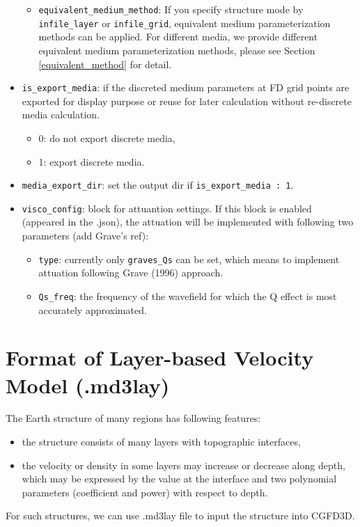 \begin{itemize}
\begin{itemize}
  \item \texttt{equivalent\_medium\_method}: If you specify structure mode by
        \texttt{infile\_layer} or \texttt{infile\_grid},
        equivalent medium parameterization methods can be applied.
        For different media, we provide different equivalent medium parameterization methods,
        please see Section \ref{equivalent_method} for detail.
  \end{itemize}
   
\item \verb|is_export_media|: if the discreted medium parameters at FD grid points are exported 
       for display purpose or reuse for later calculation without re-discrete media calculation.
    \begin{itemize}
      \item 0: do not export discrete media,
      \item 1: export discrete media.
    \end{itemize}
\item \verb|media_export_dir|: set the output dir if \verb|is_export_media : 1|.
  
\item \verb|visco_config|: block for attuantion settings.
  If this block is enabled (appeared in the .json),
    the attuation will be implemented with following two parameters (add Grave's ref):
  \begin{itemize}
    \item \verb|type|: currently only \verb|graves_Qs| can be set, which means to implement
       attuation following Grave (1996) approach.
     \item \verb|Qs_freq|: the frequency of the wavefield for which 
          the Q effect is most accurately approximated.
  \end{itemize}

\end{itemize}


\section{Format of Layer-based Velocity Model (.md3lay)} \label{md3lay}

The Earth structure of many regions has following features:
\begin{itemize}
  \item the structure consists of many layers with topographic interfaces,
  \item the velocity or density in some layers may increase or decrease along depth,
      which may be expressed by the value at the interface
      and two polynomial parameters (coefficient and power) with respect to depth.
\end{itemize}
For such structures, we can use .md3lay file to input the structure into CGFD3D.


